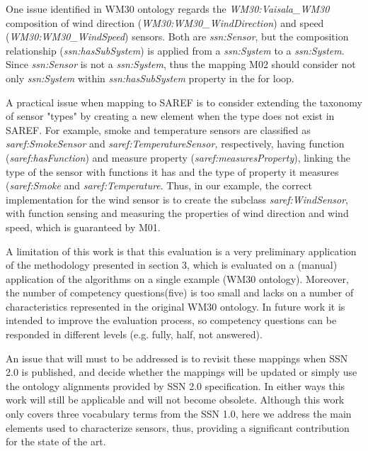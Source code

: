 \documentclass{sig-alternate-05-2015}
\begin{document}
One issue identified in WM30 ontology regards the \textit{WM30:\-Vaisala\-\_WM30} composition of wind direction (\textit{WM30:\-WM30\-\_Wind\-Direction}) and speed (\textit{WM30:\-WM30\-\_WindSpeed}) sensors. Both are \textit{ssn:\-Sensor}, but the composition relationship (\textit{ssn:\-hasSubSystem}) is applied from a \textit{ssn:\-System} to a \textit{ssn:\-System}. Since \textit{ssn:\-Sensor} is not a \textit{ssn:\-System}, thus the mapping M02 should consider not only \textit{ssn:\-System} within \textit{ssn:\-hasSubSystem} property in the for loop. 

A practical issue when mapping to SAREF is to consider extending the taxonomy of sensor "types" by creating a new element when the type does not exist in SAREF. For example, smoke and temperature sensors are classified as \textit{saref:\-SmokeSensor} and \textit{saref:\-TemperatureSensor,} respectively, having  function (\textit{saref:\-hasFunction}) and measure property (\textit{saref:\-measuresProperty}), linking the type of the sensor with functions it has and the type of property it measures (\textit{saref:\-Smoke} and \textit{saref:\-Temperature}. Thus, in our example, the correct implementation for the wind sensor is to create the subclass \textit{saref:\-WindSensor}, with function sensing and measuring the properties of wind direction and wind speed, which is guaranteed by M01. 

A limitation of this work is that this evaluation is a very preliminary application of the methodology presented in section 3, which is evaluated on a (manual) application of the algorithms on a single example (WM30 ontology). Moreover, the number of competency questions(five) is too small and lacks on a number of characteristics represented in the original WM30 ontology. In future work it is intended to improve the evaluation process, so competency questions can be responded in different levels (e.g. fully, half, not answered).

An issue that will must to be addressed is to revisit these mappings when SSN 2.0 is published, and decide whether the mappings will be updated or simply use the ontology alignments provided by SSN 2.0 specification. In either ways this work will still be applicable and will not become obsolete. Although this work only covers three vocabulary terms from the SSN 1.0, here we address the main elements used to characterize sensors, thus, providing a significant contribution for the state of the art.  


\end{document}
